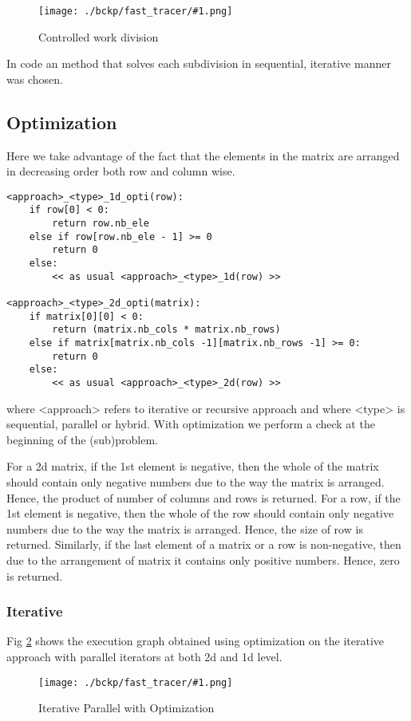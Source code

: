 \documentclass{article}
\newcommand{\loadFig}[2]{{%
\begin{figure}[!ht]
    \texttt{[image: ./bckp/fast\_tracer/\#1.png]}
    \caption{#2}
    \label{#1}
\end{figure}}
}%
\begin{document}

\loadFig{recur_cwd_2d}{Controlled work division}

In code an method that solves each subdivision in sequential, iterative manner was chosen.

\subsection{Optimization}
Here we take advantage of the fact that the elements in the matrix are arranged in decreasing order both row and column wise.
\begin{lstlisting}[caption = Optimization]
<approach>_<type>_1d_opti(row):
    if row[0] < 0:
        return row.nb_ele
    else if row[row.nb_ele - 1] >= 0
        return 0
    else:
        << as usual <approach>_<type>_1d(row) >>

<approach>_<type>_2d_opti(matrix):
    if matrix[0][0] < 0:
        return (matrix.nb_cols * matrix.nb_rows)
    else if matrix[matrix.nb_cols -1][matrix.nb_rows -1] >= 0:
        return 0
    else:
        << as usual <approach>_<type>_2d(row) >>
\end{lstlisting}
where <approach> refers to iterative or recursive approach and where <type> is sequential, parallel or hybrid.
With optimization we perform a check at the beginning of the (sub)problem.

For a 2d matrix, if the 1st element is negative, then the whole of the matrix should contain only negative numbers due to the way the matrix is arranged.
Hence, the product of number of columns and rows is returned.
For a row, if the 1st element is negative, then the whole of the row should contain only negative numbers due to the way the matrix is arranged.
Hence, the size of row is returned.
Similarly, if the last element of a matrix or a row is non-negative, then due to the arrangement of matrix it contains only positive numbers.
Hence, zero is returned.

\subsubsection{Iterative}

Fig \ref{iter_par_2d_opti} shows the execution graph obtained using optimization on the iterative approach with parallel iterators at both 2d and 1d level.

\loadFig{iter_par_2d_opti}{Iterative Parallel with Optimization}
\end{document}
